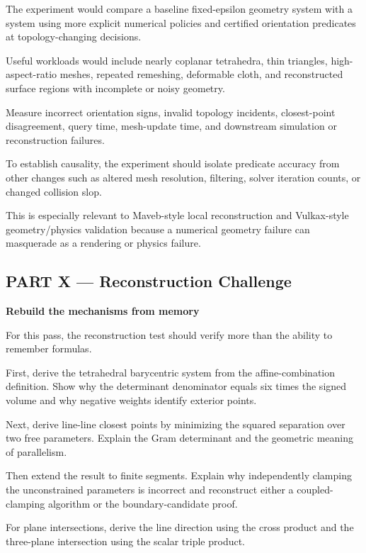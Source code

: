The experiment would compare a baseline fixed-epsilon geometry system with a system using more explicit numerical policies and certified orientation predicates at topology-changing decisions.

Useful workloads would include nearly coplanar tetrahedra, thin triangles, high-aspect-ratio meshes, repeated remeshing, deformable cloth, and reconstructed surface regions with incomplete or noisy geometry.

Measure incorrect orientation signs, invalid topology incidents, closest-point disagreement, query time, mesh-update time, and downstream simulation or reconstruction failures.

To establish causality, the experiment should isolate predicate accuracy from other changes such as altered mesh resolution, filtering, solver iteration counts, or changed collision slop.

This is especially relevant to Maveb-style local reconstruction and Vulkax-style geometry/physics validation because a numerical geometry failure can masquerade as a rendering or physics failure.

\subsection{PART X --- Reconstruction Challenge}\label{04-visual-computing-ii-ch023-part-x-reconstruction-challenge}

\hypertarget{04-visual-computing-ii-ch023-part-x-reconstruction-challenge}{}

\textbf{Rebuild the mechanisms from memory}

For this pass, the reconstruction test should verify more than the ability to remember formulas.

First, derive the tetrahedral barycentric system from the affine-combination definition. Show why the determinant denominator equals six times the signed volume and why negative weights identify exterior points.

Next, derive line-line closest points by minimizing the squared separation over two free parameters. Explain the Gram determinant and the geometric meaning of parallelism.

Then extend the result to finite segments. Explain why independently clamping the unconstrained parameters is incorrect and reconstruct either a coupled-clamping algorithm or the boundary-candidate proof.

For plane intersections, derive the line direction using the cross product and the three-plane intersection using the scalar triple product.

